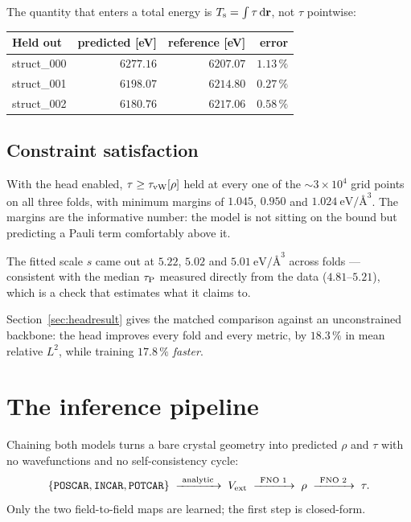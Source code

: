 The quantity that enters a total energy is $T_{\mathrm{s}}=\int\tau\,\mathrm{d}\mathbf{r}$, not
$\tau$ pointwise:

\begin{center}
\begin{tabular}{@{}lrrr@{}}
\toprule
Held out & predicted [eV] & reference [eV] & error \\
\midrule
struct\_000 & $6277.16$ & $6207.07$ & $1.13\,\%$ \\
struct\_001 & $6198.07$ & $6214.80$ & $0.27\,\%$ \\
struct\_002 & $6180.76$ & $6217.06$ & $0.58\,\%$ \\
\bottomrule
\end{tabular}
\end{center}

\subsection{Constraint satisfaction}

With the head enabled, $\tau \ge \tau_{\mathrm{vW}}[\rho]$ held at every one of the
$\sim3\times10^{4}$ grid points on all three folds, with minimum margins of
$1.045$, $0.950$ and $1.024\ \mathrm{eV}/\text{\AA}^3$. The margins are the
informative number: the model is not sitting on the bound but predicting a Pauli
term comfortably above it.

The fitted scale $s$ came out at $5.22$, $5.02$ and $5.01\
\mathrm{eV}/\text{\AA}^3$ across folds --- consistent with the median $\tau_{\mathrm{P}}$
measured directly from the data ($4.81$--$5.21$), which is a check that
\opt{fit\_pauli\_scale} estimates what it claims to.

Section~\ref{sec:headresult} gives the matched comparison against an
unconstrained backbone: the head improves every fold and every metric, by
$18.3\,\%$ in mean relative $L^2$, while training $17.8\,\%$ \emph{faster}.

\section{The inference pipeline}

Chaining both models turns a bare crystal geometry into predicted $\rho$ and
$\tau$ with no wavefunctions and no self-consistency cycle:
\begin{equation}
  \{\text{\texttt{POSCAR}}, \text{\texttt{INCAR}}, \text{\texttt{POTCAR}}\}
  \;\xrightarrow{\ \text{analytic}\ }\; V_{\mathrm{ext}}
  \;\xrightarrow{\ \text{FNO 1}\ }\; \rho
  \;\xrightarrow{\ \text{FNO 2}\ }\; \tau .
\end{equation}
Only the two field-to-field maps are learned; the first step is closed-form.

